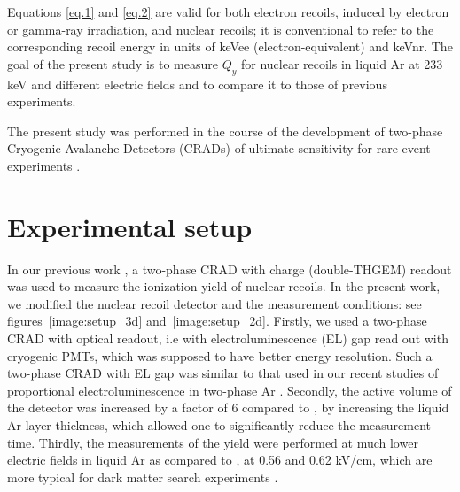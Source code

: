 \documentclass[a4paper,11pt]{article}
\begin{document}
Equations \eqref{eq.1} and \eqref{eq.2} are valid for both electron recoils, induced by electron or gamma-ray irradiation, and nuclear recoils;
it is conventional to refer to the corresponding recoil
energy in units of keVee (electron-equivalent) and keVnr. The goal
of the present study is to measure $Q_y$ for nuclear recoils in
liquid Ar at 233 keV and different electric fields and to compare it to those of previous experiments.

The present study was performed in the course of the development of two-phase Cryogenic Avalanche Detectors (CRADs) of ultimate sensitivity for rare-event experiments \cite{CRADRev12,CryoMPPC15,CryoPMT15,CRADPropEL15,XRayYield16,CRADELGap17,ArXeN2Proc17,CPMTStudy17}.

\section{Experimental setup}

In our previous work \cite{IonYield14}, a two-phase CRAD with charge (double-THGEM) readout was used to measure the ionization yield of nuclear recoils. In the present work,  we modified the nuclear recoil detector and the measurement conditions: see figures~\ref{image:setup_3d} and~\ref{image:setup_2d}. Firstly, we used a two-phase CRAD with optical readout, i.e with electroluminescence (EL) gap read out with cryogenic PMTs, which was supposed to have better energy resolution. Such a two-phase CRAD with EL gap was similar to that used in our recent studies of proportional electroluminescence in two-phase Ar \cite{CRADPropEL15,CRADELGap17}. Secondly, the active volume of the detector was increased by a factor of 6 compared to \cite{IonYield14}, by increasing the liquid Ar layer thickness, which allowed one to significantly reduce the measurement time. Thirdly, the measurements of the yield were performed at much lower electric fields in liquid Ar as compared to \cite{IonYield14}, at 0.56 and 0.62 kV/cm, which are more typical for dark matter search experiments \cite{ArDM,Darkside}.
\end{document}

